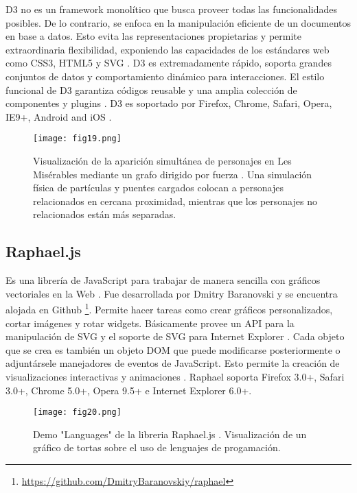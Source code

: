 D3 no es un framework monolítico que busca proveer todas las funcionalidades posibles. De lo contrario, se enfoca en la manipulación eficiente de un documentos en base a datos. Esto evita las representaciones propietarias y permite extraordinaria flexibilidad, exponiendo las capacidades de los estándares web como CSS3, HTML5 y SVG . D3 es extremadamente rápido, soporta grandes conjuntos de datos y comportamiento dinámico para interacciones. El estilo funcional de D3 garantiza códigos reusable y una amplia colección de componentes y plugins \cite{D3JS}. D3 es soportado por Firefox, Chrome, Safari, Opera, IE9+, Android and iOS \cite{GitD3}.

\begin{figure}[htp]
  \centering
  \texttt{[image: fig19.png]}
  \caption[Visualización de la aparición simultánea de personajes en Les Misérables]{Visualización de la aparición simultánea de personajes en Les Misérables mediante un grafo dirigido por fuerza \cite{D3JS}. Una simulación física de partículas y puentes cargados colocan a personajes relacionados en cercana proximidad, mientras que los personajes no relacionados están más separadas.}
  \label{fig:fig19}
\end{figure}

\subsection{Raphael.js}

Es una librería de JavaScript para trabajar de manera sencilla con gráficos vectoriales en la Web \cite{RaphJS}. Fue desarrollada por Dmitry Baranovski y se encuentra alojada en Github \footnote{\url{https://github.com/DmitryBaranovskiy/raphael}}. Permite hacer tareas como crear gráficos personalizados, cortar imágenes y rotar widgets. Básicamente provee un API para la manipulación de SVG y el soporte de SVG para Internet Explorer \cite{Bar09}. Cada objeto que se crea es también un objeto DOM que puede modificarse posteriormente o adjuntársele manejadores de eventos de JavaScript. Esto permite la creación de visualizaciones interactivas y animaciones . Raphael soporta Firefox 3.0+, Safari 3.0+, Chrome 5.0+, Opera 9.5+ e Internet Explorer 6.0+.

\begin{figure}[htp]
  \centering
  \texttt{[image: fig20.png]}
  \caption[Demo "Languages" de la libreria Raphael.js]{Demo "Languages" de la libreria Raphael.js \cite{RaphJS}. Visualización de un gráfico de tortas sobre el uso de lenguajes de progamación.}
  \label{fig:fig20}
\end{figure}

